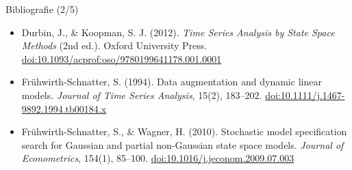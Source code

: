 \begin{frame}{Bibliografie (2/5)}
\begin{itemize}
    \item Durbin, J., \& Koopman, S. J. (2012). \textit{Time Series Analysis by State Space Methods} (2nd ed.). Oxford University Press. \href{https://doi.org/10.1093/acprof:oso/9780199641178.001.0001}{doi:10.1093/acprof:oso/9780199641178.001.0001}
    \item Frühwirth-Schnatter, S. (1994). Data augmentation and dynamic linear models. \textit{Journal of Time Series Analysis}, 15(2), 183--202. \href{https://doi.org/10.1111/j.1467-9892.1994.tb00184.x}{doi:10.1111/j.1467-9892.1994.tb00184.x}
    \item Frühwirth-Schnatter, S., \& Wagner, H. (2010). Stochastic model specification search for Gaussian and partial non-Gaussian state space models. \textit{Journal of Econometrics}, 154(1), 85--100. \href{https://doi.org/10.1016/j.jeconom.2009.07.003}{doi:10.1016/j.jeconom.2009.07.003}
\end{itemize}
\end{frame}

